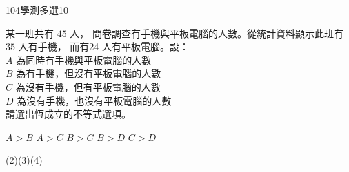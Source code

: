     \begin{QUESTION}
        \begin{ExamInfo}{104}{學測}{多選}{10}
        \end{ExamInfo}
        \begin{ExamAnsRateInfo}{45}{64}{42}{29}
        \end{ExamAnsRateInfo}
        \begin{QBODY}
            某一班共有 $45$ 人， 問卷調查有手機與平板電腦的人數。從統計資料顯示此班有 $35$ 人有手機， 而有24 人有平板電腦。設：\\
				$A$ 為同時有手機與平板電腦的人數\\
				$B$ 為有手機，但沒有平板電腦的人數\\
				$C$ 為沒有手機，但有平板電腦的人數\\
				$D$ 為沒有手機，也沒有平板電腦的人數\\
			請選出恆成立的不等式選項。
			\begin{QOPSINONELINE}
				\QOP $A>B$	\QOP $A>C$	\QOP $B>C$	\QOP $B>D$	\QOP $C>D$
			\end{QOPSINONELINE}
        \end{QBODY}
        \begin{QFROMS}
        \end{QFROMS}
        \begin{QTAGS}\end{QTAGS}
        \begin{QANS}
            (2)(3)(4)
        \end{QANS}
        \begin{QSOLLIST}
            \begin{QSOL}
			\end{QSOL}

        \end{QSOLLIST}
        \begin{QEMPTYSPACE}
        \end{QEMPTYSPACE}
    \end{QUESTION}
